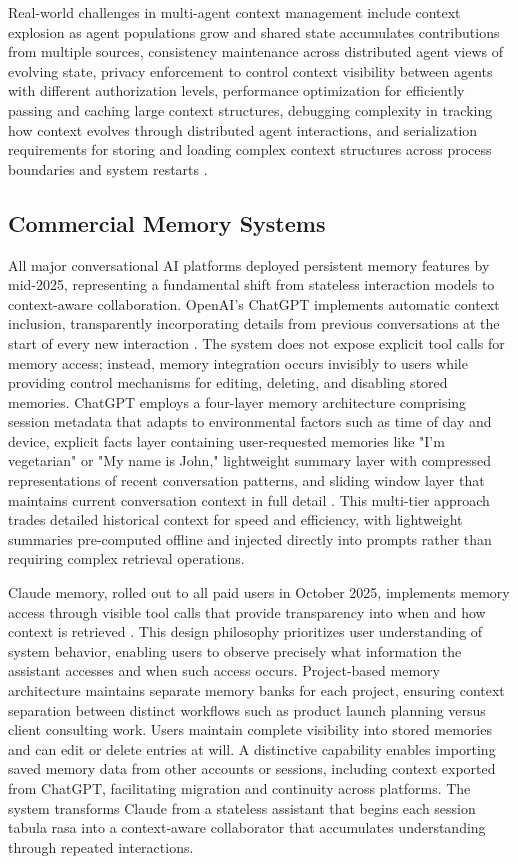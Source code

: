 Real-world challenges in multi-agent context management include context explosion as agent populations grow and shared state accumulates contributions from multiple sources, consistency maintenance across distributed agent views of evolving state, privacy enforcement to control context visibility between agents with different authorization levels, performance optimization for efficiently passing and caching large context structures, debugging complexity in tracking how context evolves through distributed agent interactions, and serialization requirements for storing and loading complex context structures across process boundaries and system restarts \citep{foxgem2024memory}.

\subsection{Commercial Memory Systems}

All major conversational AI platforms deployed persistent memory features by mid-2025, representing a fundamental shift from stateless interaction models to context-aware collaboration. OpenAI's ChatGPT implements automatic context inclusion, transparently incorporating details from previous conversations at the start of every new interaction \citep{openai2024memory}. The system does not expose explicit tool calls for memory access; instead, memory integration occurs invisibly to users while providing control mechanisms for editing, deleting, and disabling stored memories. ChatGPT employs a four-layer memory architecture comprising session metadata that adapts to environmental factors such as time of day and device, explicit facts layer containing user-requested memories like "I'm vegetarian" or "My name is John," lightweight summary layer with compressed representations of recent conversation patterns, and sliding window layer that maintains current conversation context in full detail \citep{greyling2024chatgpt}. This multi-tier approach trades detailed historical context for speed and efficiency, with lightweight summaries pre-computed offline and injected directly into prompts rather than requiring complex retrieval operations.

Claude memory, rolled out to all paid users in October 2025, implements memory access through visible tool calls that provide transparency into when and how context is retrieved \citep{anthropic2025memory}. This design philosophy prioritizes user understanding of system behavior, enabling users to observe precisely what information the assistant accesses and when such access occurs. Project-based memory architecture maintains separate memory banks for each project, ensuring context separation between distinct workflows such as product launch planning versus client consulting work. Users maintain complete visibility into stored memories and can edit or delete entries at will. A distinctive capability enables importing saved memory data from other accounts or sessions, including context exported from ChatGPT, facilitating migration and continuity across platforms. The system transforms Claude from a stateless assistant that begins each session tabula rasa into a context-aware collaborator that accumulates understanding through repeated interactions.

